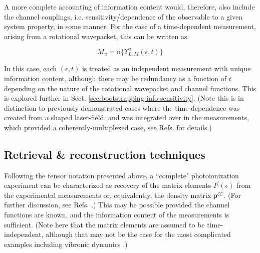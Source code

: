 \documentclass[10pt]{article}
\begin{document}
A more complete accounting of information content would, therefore,
also include the channel couplings, i.e. sensitivity/dependence of the observable to a given system property, in some manner. For the case of a time-dependent measurement, arising from a rotational wavepacket, this can be written as:

\begin{equation}
M_{u}=\mathrm{n}\{\varUpsilon_{L,M}^{u}(\epsilon,t)\}
\end{equation}

In this case, each $(\epsilon,t)$ is treated as an independent measurement with unique information content, although there may be redundancy as a function of $t$ depending on the nature of the rotational wavepacket and channel functions. This is explored further in Sect. \ref{sec:bootstrapping-info-sensitivity}. (Note this is in distinction to previously demonstrated cases where the time-dependence was created from a shaped laser-field, and was integrated over in the measurements, which provided a coherently-multiplexed case, see Refs. \cite{hockett2014CompletePhotoionizationExperiments, hockett2015CompletePhotoionizationExperiments,hockett2015CoherentControlPhotoelectron} for details.)









\subsection{Retrieval \& reconstruction techniques\label{sec:recon-techniques-intro}}


Following the tensor notation presented above, a ``complete" photoionization experiment can be characterized as recovery of the matrix elements $I^{\zeta}(\epsilon)$ from the experimental measurements or, equivalently, the density matrix $\mathbf{\rho}^{\zeta\zeta'}$. (For further discussion, see Refs. \cite{Reid2003,kleinpoppen2013perfect,hockett2018QMP1}.) This may be possible provided the channel functions are known, and the information content of the measurements is sufficient. (Note here that the matrix elements are assumed to be time-independent, although that may not be the case for the most complicated examples including vibronic dynamics \cite{hockett2018QMP2}.) 
\end{document}
